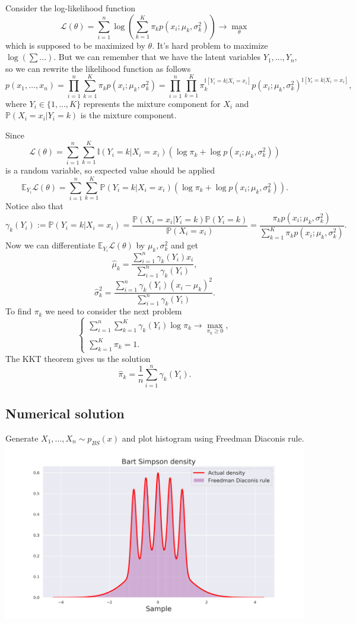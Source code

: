 \documentclass[a4paper, 12pt]{article}
\begin{document}
Consider the log-likelihood function
$$
\mathcal{L}(\theta) = \sum \limits_{i=1}^n \log \left( \sum \limits_{k=1}^K \pi_k p(x_i; \mu_k, \sigma^2_k) \right) \rightarrow \max \limits_{\theta}
$$
which is supposed to be maximized by $\theta.$
It's hard problem to maximize $\log(\sum \ldots).$ But we can remember that we have the latent variables $Y_1, \ldots, Y_n,$ so we can rewrite the likelihood function as follows
$$
p(x_1, \ldots, x_n) = \prod \limits_{i=1}^n \sum \limits_{k=1}^K \pi_k p(x_i; \mu_k, \sigma^2_k) = \prod \limits_{i=1}^n \prod \limits_{k=1}^K \pi_k^{\mathbb{I}[Y_i = k|X_i = x_i]} p(x_i; \mu_k, \sigma^2_k)^{\mathbb{I}[Y_i = k|X_i = x_i]},
$$
where $ Y_i \in \{ 1, \ldots, K \}$ represents the mixture component for $X_i$ and $\mathbb{P}(X_i = x_i|Y_i = k)$ is the mixture component.

Since 
$$
\mathcal{L}(\theta) =  \sum \limits_{i=1}^n \sum \limits_{k=1}^K \mathbb{I}(Y_i = k|X_i = x_i) (\log \pi_k + \log p(x_i; \mu_k, \sigma^2_k))
$$ 
is a random variable, so expected value should be applied
$$
\mathbb{E}_{Y_i} \mathcal{L}(\theta) =  \sum \limits_{i=1}^n \sum \limits_{k=1}^K \mathbb{P}(Y_i = k|X_i = x_i) (\log \pi_k + \log p(x_i; \mu_k, \sigma^2_k)).
$$ 
Notice also that
$$
\gamma_k(Y_i) := \mathbb{P}(Y_i = k | X_i = x_i) = \dfrac{\mathbb{P}(X_i = x_i | Y_i = k) \mathbb{P}(Y_i = k)}{\mathbb{P}(X_i = x_i)} = \dfrac{\pi_k p(x_i; \mu_k, \sigma^2_k)}{\sum \limits_{k=1}^K \pi_k p(x_i; \mu_k, \sigma^2_k)}.
$$
Now we can differentiate $\mathbb{E}_{Y_i} \mathcal{L}(\theta)$ by $\mu_k, \sigma_k^2$ and get 
$$
\hat{\mu}_k = \dfrac{\sum \limits_{i=1}^n \gamma_k(Y_i) x_i}{\sum \limits_{i=1}^n \gamma_k(Y_i)},
$$
$$
\hat{\sigma}_k^2 = \dfrac{\sum \limits_{i=1}^n \gamma_k(Y_i) (x_i - \mu_k)^2}{\sum \limits_{i=1}^n \gamma_k(Y_i)}.
$$
To find $\pi_k$ we need to consider the next problem
$$
\begin{cases}
\sum \limits_{i=1}^n \sum \limits_{k=1}^K \gamma_k(Y_i) \log \pi_k \rightarrow \max \limits_{\pi_k \geqslant 0}, \\
\sum \limits_{k=1}^K \pi_k = 1.
\end{cases}
$$
The KKT theorem gives us the solution
$$
\hat{\pi}_k = \dfrac{1}{n} \sum \limits_{i=1}^n \gamma_k(Y_i).
$$
\subsection{Numerical solution}
Generate $X_1, \ldots, X_n \sim p_{BS}(x)$ and plot histogram using Freedman Diaconis rule. 
\includegraphics[width=\textwidth]{Images/Task3_1.png}
 
\end{document}

